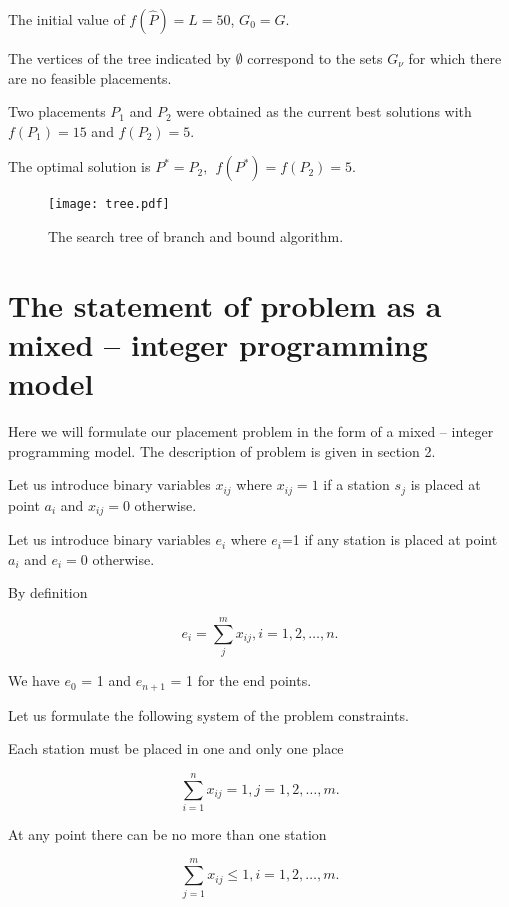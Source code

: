 The initial value of $f(\widehat{P})=L=50$, $G_0=G$.

The vertices of the tree indicated by $\emptyset$  correspond to the sets $G_\nu$ for which there are no feasible placements.

Two placements $P_1$ and $P_2$ were obtained as the current best solutions  with $f(P_1)=15$ and $f(P_2)=5$.

The optimal solution is $P^\ast=P_2,\ \ f\left(P^\ast\right)=f\left(P_2\right)=5$.

\begin{figure}
\texttt{[image: tree.pdf]}
\caption{The search tree of branch and bound algorithm.} \label{fig2}
\end{figure}

\section{The statement of problem as a mixed – integer programming model}
Here we will formulate our placement problem in the form of a mixed – integer programming model. The description of problem is given in section 2.

Let us introduce binary variables $x_{ij}$ where $x_{ij}=1$ if a station $s_j$ is placed at point $a_i$ and $x_{ij}=0$ otherwise.

Let us introduce binary variables $e_i$ where $e_i$=1 if any station is placed at point $a_i$ and $e_i=0$ otherwise.

By definition

\begin{displaymath}
e_i=\sum_{j}^{m}{x_{ij}}, i=1,2,\ldots,n.
\end{displaymath}

We have $e_0$ = 1 and $e_{n+1}$ = 1 for the end points.

Let us formulate the following system of the problem constraints.

Each station must be placed in one and only one place

\begin{displaymath}
\sum_{i=1}^{n}{x_{ij}=1}, j=1,2,\ldots,m.
\end{displaymath}

At any point there can be no more than one station

\begin{displaymath}
\sum_{j=1}^{m}{x_{ij} \leq 1}, i=1,2,\ldots,m.
\end{displaymath}

